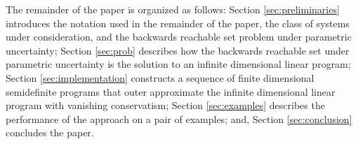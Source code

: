 The remainder of the paper is organized as follows: 
Section \ref{sec:preliminaries} introduces the notation used in the remainder of the paper, the class of systems under consideration, and the backwards reachable set problem under parametric uncertainty; 
Section \ref{sec:prob} describes how the backwards reachable set under parametric uncertainty is the solution to an infinite dimensional linear program; 
Section \ref{sec:implementation} constructs a sequence of finite dimensional semidefinite programs that outer approximate the infinite dimensional linear program with vanishing conservatism; 
Section \ref{sec:examples} describes the performance of the approach on a pair of examples; 
and, Section \ref{sec:conclusion} concludes the paper. 